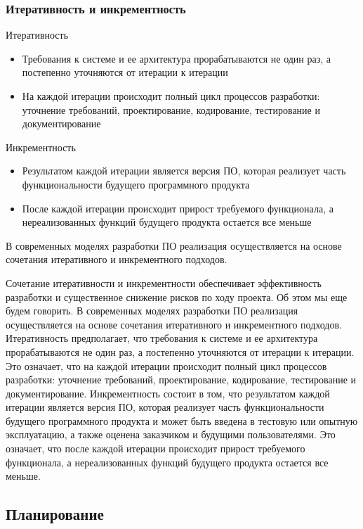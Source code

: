 \documentclass{../industrial-development}
\begin{document}
    \begin{frame} \frametitle{Итеративность и инкрементность}
	Итеративность
	\begin{itemize}
		\item Требования к системе и ее архитектура прорабатываются не один раз, а постепенно уточняются от итерации к итерации
		\item На каждой итерации происходит полный цикл процессов разработки: уточнение требований, проектирование, кодирование, тестирование и документирование
	\end{itemize}
	Инкрементность
	\begin{itemize}
		\item Результатом каждой итерации является версия ПО, которая реализует часть функциональности будущего программного продукта
		\item После каждой итерации происходит прирост требуемого функционала, а нереализованных функций будущего продукта остается все меньше
	\end{itemize}
    \end{frame}
    \lecturenotes

В современных моделях разработки ПО реализация осуществляется на основе сочетания итеративного и инкрементного подходов.


Сочетание итеративности и инкрементности обеспечивает эффективность разработки и существенное снижение рисков по ходу проекта. Об этом мы еще будем говорить.
В современных моделях разработки ПО реализация осуществляется на основе сочетания итеративного и инкрементного подходов.
Итеративность предполагает, что требования к системе и ее архитектура прорабатываются не один раз, а постепенно уточняются от итерации к итерации. Это означает, что на каждой итерации происходит полный цикл процессов разработки: уточнение требований, проектирование, кодирование, тестирование и документирование.
Инкрементность состоит в том, что результатом каждой итерации является версия ПО, которая реализует часть функциональности будущего программного продукта и может быть введена в тестовую или опытную эксплуатацию, а также оценена заказчиком и будущими пользователями. Это означает, что после каждой итерации происходит прирост требуемого функционала, а нереализованных функций будущего продукта остается все меньше.





    \subsection{Планирование}
\end{document}
